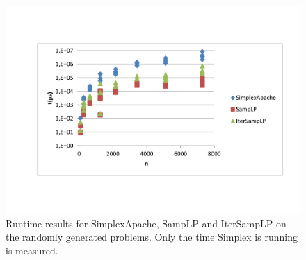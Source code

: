 \documentclass[nocopyrightspace]{acm_proc_article-sp}
\begin{document}
\begin{figure}[h!]
\includegraphics[width=\columnwidth]{../Results/runtime_Simplex.pdf}
\caption{Runtime results for SimplexApache, SampLP and IterSampLP on the randomly generated problems. Only the time Simplex is running is measured.}
\label{fig:simplexruntime}
\end{figure}
\end{document}
